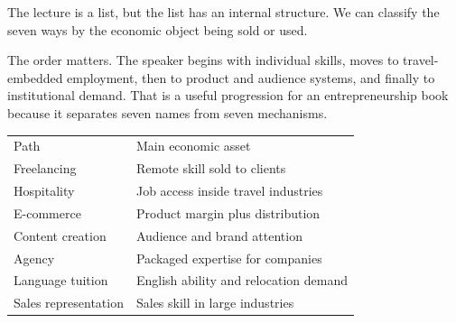 The lecture is a list, but the list has an internal structure. We can classify the seven ways by the economic object being sold or used.

\begin{figure}
\centering
{}
\end{figure}

The order matters. The speaker begins with individual skills, moves to travel-embedded employment, then to product and audience systems, and finally to institutional demand. That is a useful progression for an entrepreneurship book because it separates seven names from seven mechanisms.

\begin{table}
\centering
\begin{tabular}{l l}
Path & Main economic asset \\
Freelancing & Remote skill sold to clients \\
Hospitality & Job access inside travel industries \\
E-commerce & Product margin plus distribution \\
Content creation & Audience and brand attention \\
Agency & Packaged expertise for companies \\
Language tuition & English ability and relocation demand \\
Sales representation & Sales skill in large industries \\
\end{tabular}
\end{table}

